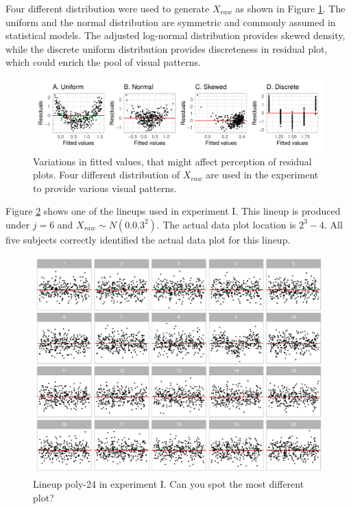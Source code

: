 \documentclass[]{interact}
\theoremstyle{plain}%
\theoremstyle{definition}
\theoremstyle{remark}
\begin{document}
Four different distribution were used to generate \(X_{raw}\) as shown
in Figure \ref{fig:different-dist}. The uniform and the normal
distribution are symmetric and commonly assumed in statistical models.
The adjusted log-normal distribution provides skewed density, while the
discrete uniform distribution provides discreteness in residual plot,
which could enrich the pool of visual patterns.

\begin{figure}

{\centering \includegraphics[width=1\linewidth]{paper_comparison_files/figure-latex/different-dist-1} 

}

\caption{Variations in fitted values, that might affect perception of residual plots. Four different distribution of $X_{raw}$ are used in the experiment to provide various visual patterns.}\label{fig:different-dist}
\end{figure}

Figure \ref{fig:example-poly-lineup} shows one of the lineups used in
experiment I. This lineup is produced under \(j = 6\) and
\(X_{raw} \sim N(0.0.3^2)\). The actual data plot location is
\(2^3 - 4\). All five subjects correctly identified the actual data plot
for this lineup.

\begin{figure}

{\centering \includegraphics[width=1\linewidth]{paper_comparison_files/figure-latex/example-poly-lineup-1} 

}

\caption{Lineup poly-24 in experiment I. Can you spot the most different plot? \label{fig:example-poly-lineup}}\label{fig:example-poly-lineup}
\end{figure}
\end{document}
